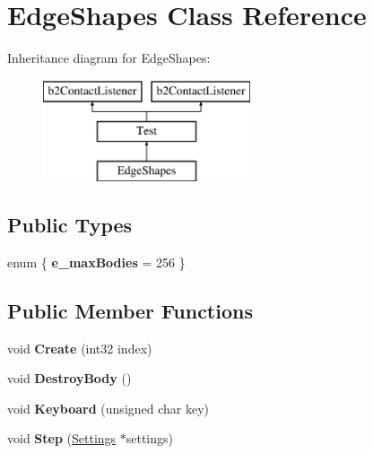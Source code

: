 \hypertarget{class_edge_shapes}{\section{Edge\-Shapes Class Reference}
\label{class_edge_shapes}
}
Inheritance diagram for Edge\-Shapes\-:\begin{figure}[H]
\begin{center}
\leavevmode
\includegraphics[height=3.000000cm]{class_edge_shapes}
\end{center}
\end{figure}
\subsection*{Public Types}
\begin{DoxyCompactItemize}
\item 
enum \{ {\bfseries e\-\_\-max\-Bodies} =  256
 \}
\end{DoxyCompactItemize}
\subsection*{Public Member Functions}
\begin{DoxyCompactItemize}
\item 
\hypertarget{class_edge_shapes_a9f54a85464cdd6bcb42b67c1f999b5fa}{void {\bfseries Create} (int32 index)}\label{class_edge_shapes_a9f54a85464cdd6bcb42b67c1f999b5fa}

\item 
\hypertarget{class_edge_shapes_a9c2a64cd739ce13c750b69eb75858d9d}{void {\bfseries Destroy\-Body} ()}\label{class_edge_shapes_a9c2a64cd739ce13c750b69eb75858d9d}

\item 
\hypertarget{class_edge_shapes_a2d8db0a22bbb9d01e7556f7416c4433f}{void {\bfseries Keyboard} (unsigned char key)}\label{class_edge_shapes_a2d8db0a22bbb9d01e7556f7416c4433f}

\item 
\hypertarget{class_edge_shapes_a9bcfaf65ecedee94a2d483e30f01d584}{void {\bfseries Step} (\hyperlink{struct_settings}{Settings} $\ast$settings)}\label{class_edge_shapes_a9bcfaf65ecedee94a2d483e30f01d584}

\end{DoxyCompactItemize}
